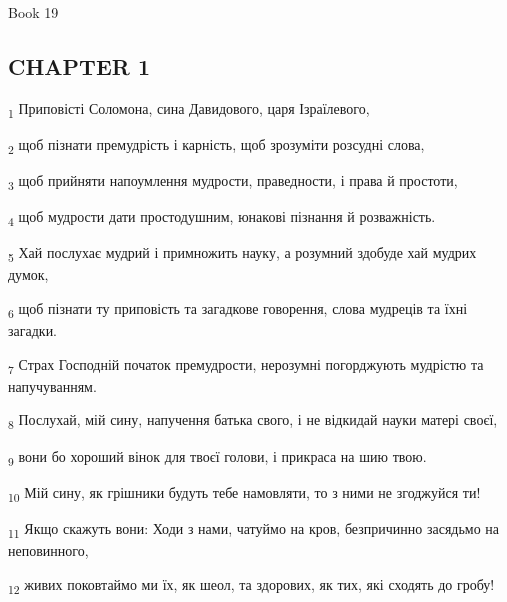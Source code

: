 Book 19
\subsection{CHAPTER 1}
\begin{tcolorbox}
\textsubscript{1} Приповісті Соломона, сина Давидового, царя Ізраїлевого,
\end{tcolorbox}
\begin{tcolorbox}
\textsubscript{2} щоб пізнати премудрість і карність, щоб зрозуміти розсудні слова,
\end{tcolorbox}
\begin{tcolorbox}
\textsubscript{3} щоб прийняти напоумлення мудрости, праведности, і права й простоти,
\end{tcolorbox}
\begin{tcolorbox}
\textsubscript{4} щоб мудрости дати простодушним, юнакові пізнання й розважність.
\end{tcolorbox}
\begin{tcolorbox}
\textsubscript{5} Хай послухає мудрий і примножить науку, а розумний здобуде хай мудрих думок,
\end{tcolorbox}
\begin{tcolorbox}
\textsubscript{6} щоб пізнати ту приповість та загадкове говорення, слова мудреців та їхні загадки.
\end{tcolorbox}
\begin{tcolorbox}
\textsubscript{7} Страх Господній початок премудрости, нерозумні погорджують мудрістю та напучуванням.
\end{tcolorbox}
\begin{tcolorbox}
\textsubscript{8} Послухай, мій сину, напучення батька свого, і не відкидай науки матері своєї,
\end{tcolorbox}
\begin{tcolorbox}
\textsubscript{9} вони бо хороший вінок для твоєї голови, і прикраса на шию твою.
\end{tcolorbox}
\begin{tcolorbox}
\textsubscript{10} Мій сину, як грішники будуть тебе намовляти, то з ними не згоджуйся ти!
\end{tcolorbox}
\begin{tcolorbox}
\textsubscript{11} Якщо скажуть вони: Ходи з нами, чатуймо на кров, безпричинно засядьмо на неповинного,
\end{tcolorbox}
\begin{tcolorbox}
\textsubscript{12} живих поковтаймо ми їх, як шеол, та здорових, як тих, які сходять до гробу!
\end{tcolorbox}
